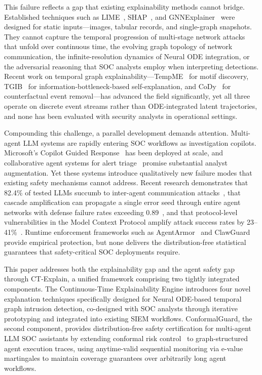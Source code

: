 \documentclass[preprint,review,12pt]{elsarticle}
\begin{document}
This failure reflects a gap that existing explainability methods cannot bridge. Established techniques such as LIME~\cite{ribeiro_lime_2016}, SHAP~\cite{lundberg_shap_2017}, and GNNExplainer~\cite{ying_gnnexplainer_2019} were designed for static inputs---images, tabular records, and single-graph snapshots. They cannot capture the temporal progression of multi-stage network attacks that unfold over continuous time, the evolving graph topology of network communication, the infinite-resolution dynamics of Neural ODE integration, or the adversarial reasoning that SOC analysts employ when interpreting detections. Recent work on temporal graph explainability---TempME~\cite{tempme_2024} for motif discovery, TGIB~\cite{tgib_kdd_2024} for information-bottleneck-based self-explanation, and CoDy~\cite{cody_2025} for counterfactual event removal---has advanced the field significantly, yet all three operate on discrete event streams rather than ODE-integrated latent trajectories, and none has been evaluated with security analysts in operational settings.

Compounding this challenge, a parallel development demands attention. Multi-agent LLM systems are rapidly entering SOC workflows as investigation copilots. Microsoft's Copilot Guided Response~\cite{microsoft_cgr_2024} has been deployed at scale, and collaborative agent systems for alert triage~\cite{cortex_agents_2025} promise substantial analyst augmentation. Yet these systems introduce qualitatively new failure modes that existing safety mechanisms cannot address. Recent research demonstrates that 82.4\% of tested LLMs succumb to inter-agent communication attacks~\cite{dark_side_llm_agents_2025}, that cascade amplification can propagate a single error seed through entire agent networks with defense failure rates exceeding 0.89~\cite{spark_to_fire_2026}, and that protocol-level vulnerabilities in the Model Context Protocol amplify attack success rates by 23--41\%~\cite{breaking_mcp_2026}. Runtime enforcement frameworks such as AgentArmor~\cite{agentarmor_2025} and ClawGuard~\cite{clawguard_2025} provide empirical protection, but none delivers the distribution-free statistical guarantees that safety-critical SOC deployments require.

This paper addresses both the explainability gap and the agent safety gap through CT-Explain, a unified framework comprising two tightly integrated components. The Continuous-Time Explainability Engine introduces four novel explanation techniques specifically designed for Neural ODE-based temporal graph intrusion detection, co-designed with SOC analysts through iterative prototyping and integrated into existing SIEM workflows. ConformalGuard, the second component, provides distribution-free safety certification for multi-agent LLM SOC assistants by extending conformal risk control~\cite{angelopoulos_crc_2024} to graph-structured agent execution traces, using anytime-valid sequential monitoring via e-value martingales to maintain coverage guarantees over arbitrarily long agent workflows.
\end{document}
